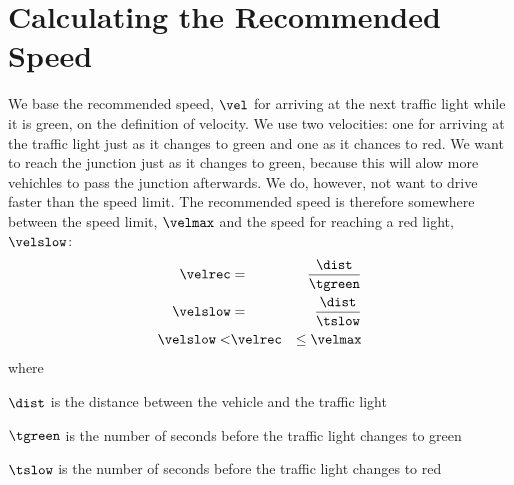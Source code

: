 \section{Calculating the Recommended Speed}

We base the recommended speed, $\vel$ for arriving at the next traffic light while it is green, on the definition of velocity.
We use two velocities: one for arriving at the traffic light just as it changes to green and one as it chances to red.
We want to reach the junction just as it changes to green, because this will alow more vehichles to pass the junction afterwards.
We do, however, not want to drive faster than the speed limit.
The recommended speed is therefore somewhere between the speed limit, $\velmax$ and the speed for reaching a red light, $\velslow$:
\begin{eqnarray}
\velrec &=& \frac{\dist}{\tgreen}\label{eq:Math:h}\\
\velslow &=& \frac{\dist}{\tslow}\nonumber\\
\velslow < &\velrec& \leq \velmax\label{eq:Math:recSpeed}
\end{eqnarray}
where
\vspace{-5mm}
\begin{itemize*}
\item $\dist$ is the distance between the vehicle and the traffic light
\item $\tgreen$ is the number of seconds before the traffic light changes to green
\item $\tslow$ is the number of seconds before the traffic light changes to red
\end{itemize*}

